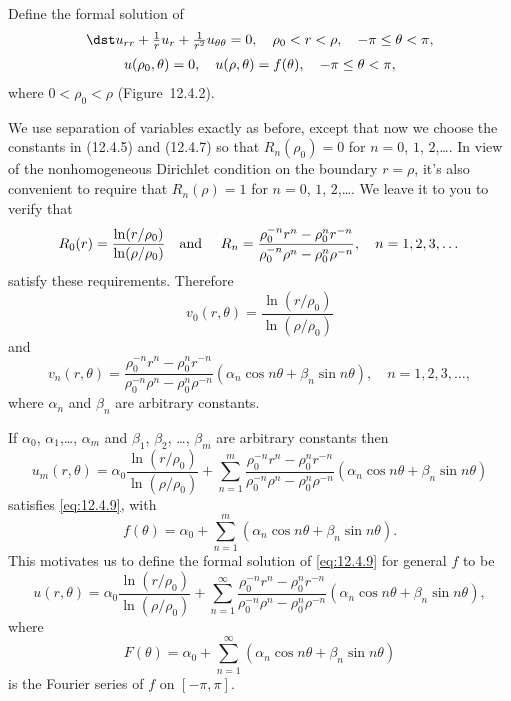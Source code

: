 \setcounter{example}{1}
\setcounter{equation}{8}
\begin{example}
  \label{example:12.4.2} \rm Define the formal solution of
  \begin{equation}
    \label{eq:12.4.9}
    \begin{array}{c}
      \dst u_{rr}+\frac{1}{r}u_{r}+\frac{1}{r^{2}}u_{\theta\theta}=0,\quad \rho_{0}<r<\rho,\quad-\pi\le\theta<\pi, \\[2\jot]
      u(\rho_{0},\theta)=0,\quad u(\rho,\theta)=f(\theta),\quad -\pi\le\theta<\pi,
    \end{array}
  \end{equation}
  where $0<\rho_{0}<\rho$ (Figure~12.4.2).
\end{example}
\begin{examplesolution}
\solution We use separation of variables exactly as before, except that now we choose the constants
in \textup{(12.4.5)} and \textup{(12.4.7)} so that $R_{n}(\rho_{0})=0$ for $n=0$, $1$, $2$,\dots. In
view of the nonhomogeneous Dirichlet condition on the boundary $r=\rho$, it's also convenient to
require that $R_{n}(\rho)=1$ for $n=0$, $1$, $2$,\dots. We leave it to you to verify that
\[
  R_{0}(r)=\frac{\ln(r/\rho_{0})}{\ln(\rho/\rho_{0})}\mbox{\quad and \quad}R_{n}=\frac{\rho_{0}^{-n}r^{n}-\rho_{0}^{n}r^{-n}}{\rho_{0}^{-n}\rho^{n}-\rho_{0}^{n}\rho^{-n}},\quad n=1,2,3,\dots
\]
satisfy these requirements. Therefore
\[
  v_{0}(r,\theta)=\frac{\ln(r/\rho_{0})}{\ln(\rho/\rho_{0})}
\]
and
\[
  v_{n}(r,\theta)=\frac{\rho_{0}^{-n}r^{n}-\rho_{0}^{n}r^{-n}}{\rho_{0}^{-n}\rho^{n}-\rho_{0}^{n}\rho^{-n}}(\alpha_{n}\cos n\theta+\beta_{n}\sin n\theta), \quad n=1,2,3,\dots,
\]
where $\alpha_{n}$ and $\beta_{n}$ are arbitrary constants.

If $\alpha_{0}$, $\alpha_{1}$,\dots, $\alpha_{m}$ and $\beta_{1}$, $\beta_{2}$, \dots, $\beta_{m}$
are arbitrary constants then
\[
  u_{m}(r,\theta)=\alpha_{0}\frac{\ln(r/\rho_{0})}{\ln(\rho/\rho_{0})}+ \sum_{n=1}^{m}\frac{\rho_{0}^{-n}r^{n}-\rho_{0}^{n}r^{-n}}{\rho_{0}^{-n}\rho^{n}-\rho_{0}^{n}\rho^{-n}}(\alpha_{n}\cos n\theta+\beta_{n}\sin n\theta)
\]
satisfies \eqref{eq:12.4.9}, with
\[
  f(\theta) =\alpha_{0}+\sum_{n=1}^{m}(\alpha_{n}\cos n\theta+\beta_{n}\sin n\theta).
\]
This motivates us to define the formal solution of \eqref{eq:12.4.9} for general $f$ to be
\[
  u(r,\theta)=\alpha_{0}\frac{\ln(r/\rho_{0})}{\ln(\rho/\rho_{0})}+ \sum_{n=1}^{\infty}\frac{\rho_{0}^{-n}r^{n}-\rho_{0}^{n}r^{-n}}{\rho_{0}^{-n}\rho^{n}-\rho_{0}^{n}\rho^{-n}}(\alpha_{n}\cos n\theta+\beta_{n}\sin n\theta),
\]
where
\[
  F(\theta) =\alpha_{0}+\sum_{n=1}^{\infty}(\alpha_{n}\cos n\theta+\beta_{n}\sin n\theta)
\]
is the Fourier series of $f$ on $[-\pi,\pi]$.
\end{examplesolution}

